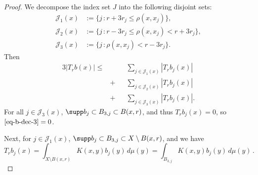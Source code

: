\begin{proof}
\leanok
We decompose the index set $J$ into the following disjoint sets:
\begin{align*}
    \mathcal{J}_1(x)&:=\{j\,: r+3r_j \le \rho(x,x_j) \},\\
    \mathcal{J}_2(x)&:=\{j\,: r-3r_j \le \rho(x,x_j) < r+3r_j\},\\
    \mathcal{J}_3(x)&:=\{j\,: \rho(x,x_j) < r-3r_j\}.
\end{align*}
Then
\begin{alignat}{3}
    \label{eq-b-dec-1}
    |T_r b(x)|\le&&&\sum_{j\in \mathcal{J}_1(x)} |T_rb_j(x)| \\
    \label{eq-b-dec-2}
                &+&&\sum_{j\in \mathcal{J}_2(x)} |T_rb_j(x)| \\
    \label{eq-b-dec-3}
                &+&&\sum_{j\in \mathcal{J}_3(x)} |T_rb_j(x)|.
\end{alignat}
For all $j\in \mathcal{J}_3(x)$, $\supp b_j\subset B_{3,j}\subset B(x,r)$, and thus $T_rb_j(x)=0$, so $\eqref{eq-b-dec-3} = 0$.

Next, for $j\in \mathcal{J}_1(x)$, $\supp b_j\subset B_{3,j}\subset X \setminus B(x,r)$, and we have
\begin{equation*}
    T_rb_j(x)=\int_{X\setminus B(x,r)} K(x,y) b_j(y)\,d\mu(y)=\int_{B_{3,j}} K(x,y) b_j(y)\,d\mu(y)\,.
\end{equation*}


\end{proof}
